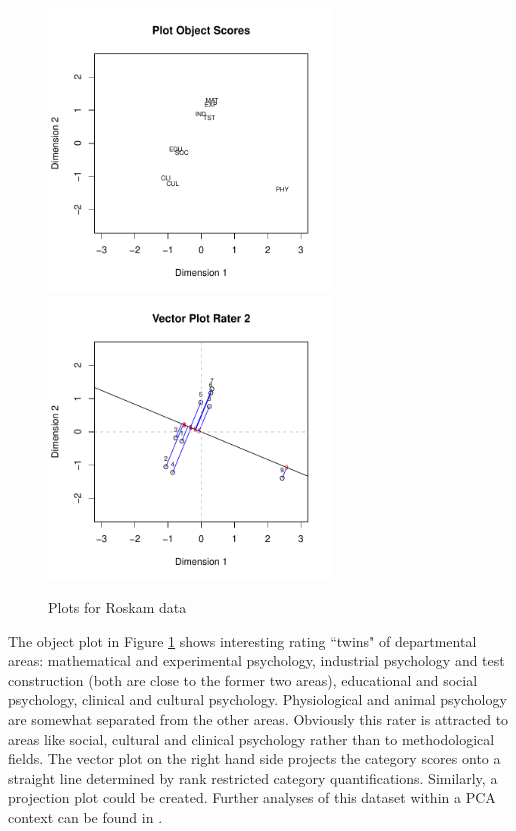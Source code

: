 \documentclass[article, nojss]{jss}
\begin{document}
\begin{figure}[hbt]
\begin{center}
\includegraphics[height=75mm, width=75mm]{roskamobj.pdf}
\includegraphics[height=75mm, width=75mm]{roskamvec.pdf}
\caption{\label{fig:roskam}Plots for Roskam data}
\end{center}
\end{figure}

The object plot in Figure \ref{fig:roskam} shows interesting rating ``twins" of departmental areas: mathematical and experimental psychology, industrial psychology and test construction (both are close to the former two areas), educational and social psychology, clinical and cultural psychology. Physiological and animal psychology are somewhat separated from the other areas. Obviously this rater is attracted to areas like social, cultural and clinical psychology rather than to methodological fields. 
The vector plot on the right hand side projects the category scores onto a straight line determined by rank restricted category quantifications. Similarly, a projection plot could be created. Further analyses of this dataset within a PCA context can be found in \citet{deLeeuw:06}. 
 
\end{document}

